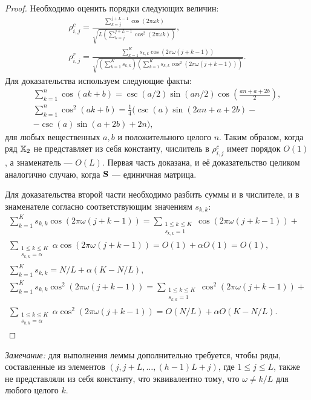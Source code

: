 \documentclass[12pt,a4paper,fleqn,leqno]{article}
\begin{document}
\begin{proof}
Необходимо оценить порядки следующих величин:
\begin{gather*}
\rho^c_{i,j} = \frac{\sum_{k=j}^{j + L - 1} \cos(2 \pi \omega k)}{\sqrt{L (\sum_{k=j}^{j + L - 1} \cos^2(2 \pi \omega k))}},\\ \rho^r_{i,j} = \frac{\sum_{k=1}^K s_{k,k}\cos(2 \pi \omega (j + k - 1))}{\sqrt{(\sum_{k=1}^K s_{k,k}) (\sum_{k=1}^K s_{k,k}\cos^2(2 \pi \omega (j + k - 1)))}}.
\end{gather*}
Для доказательства используем следующие факты:
\begin{gather*}
\sum_{k=1}^n \cos(ak + b) = \csc(a/2) \sin(an / 2) \cos \left(\frac{an + a + 2b}{2} \right), \\
\sum_{k=1}^n \cos^2(ak + b) = \frac{1}{4}(\csc(a) \sin(2an + a + 2b) -\\ - \csc(a)\sin(a + 2b) + 2n),
\end{gather*}
для любых вещественных $a, b$ и положительного целого $n$.
Таким образом, когда ряд $\mathbb{X}_2$ не представляет из себя константу, числитель в $\rho^c_{i,j}$ имеет порядок $O(1)$, а знаменатель --- $O(L)$. Первая часть доказана, и её доказательство целиком аналогично случаю, когда $\mathbf{S}$ --- единичная матрица.

Для доказательства второй части необходимо разбить суммы и в числителе, и в знаменателе согласно соответствующим значениям $s_{k,k}$:
\begin{gather*}
\sum_{k=1}^K s_{k,k}\cos(2 \pi \omega (j + k - 1)) = \sum_{\substack{1 \le k \le K \\ s_{k,k} = 1}}\cos(2 \pi \omega (j + k - 1)) +\\ \sum_{\substack{1 \le k \le K \\ s_{k,k} = \alpha}}\alpha \cos(2 \pi \omega (j + k - 1)) = O(1) + \alpha O(1) = O(1),\\
\sum_{k=1}^K s_{k,k} = N/L + \alpha(K - N/L),\\
\sum_{k=1}^K s_{k,k}\cos^2(2 \pi \omega (j + k - 1)) = \sum_{\substack{1 \le k \le K \\ s_{k,k} = 1}}\cos^2(2 \pi \omega (j + k - 1)) +\\ \sum_{\substack{1 \le k \le K \\ s_{k,k} = \alpha}}\alpha \cos^2(2 \pi \omega (j + k - 1)) = O(N/L) + \alpha O(K - N/L).
\end{gather*}
\end{proof}
\emph{Замечание:} для выполнения леммы дополнительно требуется, чтобы ряды, составленные из элементов $(j, j + L, \ldots, (h-1)L + j)$, где $1 \le j \le L$, также не представляли из себя константу, что эквивалентно тому, что $\omega \ne k/L$ для любого целого $k$.
\end{document}
